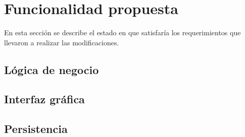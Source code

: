 \newpage
\section{Funcionalidad propuesta}

\par En esta sección se describe el estado en que satisfaría los requerimientos que llevaron a realizar las modificaciones.

\subsection{Lógica de negocio}


\subsection{Interfaz gráfica}

\subsection{Persistencia}
